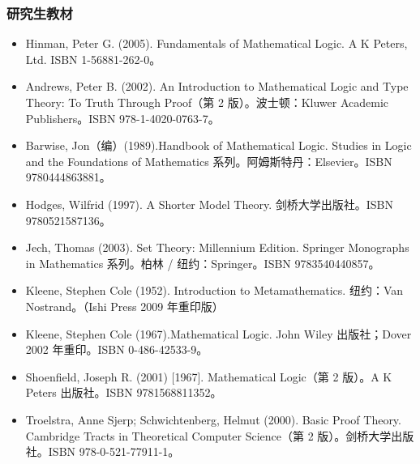 \subsubsection{研究生教材}
\begin{itemize}
  \item Hinman, Peter G. (2005). Fundamentals of Mathematical Logic. A K Peters, Ltd. ISBN 1-56881-262-0。
  \item Andrews, Peter B. (2002). An Introduction to Mathematical Logic and Type Theory: To Truth Through Proof（第 2 版）。波士顿：Kluwer Academic Publishers。ISBN 978-1-4020-0763-7。
  \item Barwise, Jon（编）(1989).Handbook of Mathematical Logic. Studies in Logic and the Foundations of Mathematics 系列。阿姆斯特丹：Elsevier。ISBN 9780444863881。
  \item Hodges, Wilfrid (1997). A Shorter Model Theory. 剑桥大学出版社。ISBN 9780521587136。
  \item Jech, Thomas (2003). Set Theory: Millennium Edition. Springer Monographs in Mathematics 系列。柏林 / 纽约：Springer。ISBN 9783540440857。
  \item Kleene, Stephen Cole (1952). Introduction to Metamathematics. 纽约：Van Nostrand。（Ishi Press 2009 年重印版）
  \item Kleene, Stephen Cole (1967).Mathematical Logic. John Wiley 出版社；Dover 2002 年重印。ISBN 0-486-42533-9。
  \item Shoenfield, Joseph R. (2001) [1967]. Mathematical Logic（第 2 版）。A K Peters 出版社。ISBN 9781568811352。
  \item Troelstra, Anne Sjerp; Schwichtenberg, Helmut (2000). Basic Proof Theory. Cambridge Tracts in Theoretical Computer Science（第 2 版）。剑桥大学出版社。ISBN 978-0-521-77911-1。
\end{itemize}
